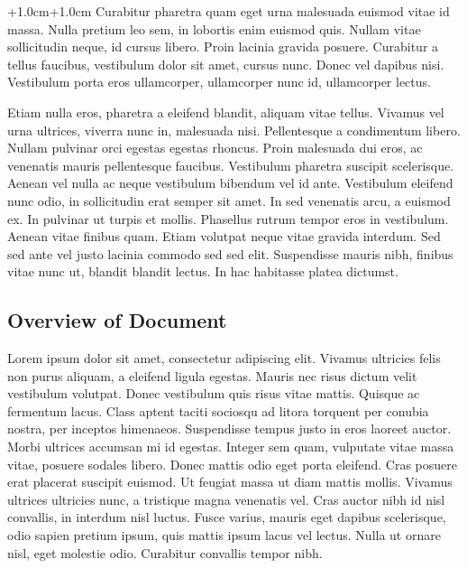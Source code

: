 \documentclass[english]{article}
\begin{document}
\begin{adjustwidth*}{+1.0cm}{+1.0cm}
{\large{}Curabitur pharetra quam eget urna malesuada euismod vitae
id massa. Nulla pretium leo sem, in lobortis enim euismod quis. Nullam
vitae sollicitudin neque, id cursus libero. Proin lacinia gravida
posuere. Curabitur a tellus faucibus, vestibulum dolor sit amet, cursus
nunc. Donec vel dapibus nisi. Vestibulum porta eros ullamcorper, ullamcorper
nunc id, ullamcorper lectus.}{\large \par}

{\large{}Etiam nulla eros, pharetra a eleifend blandit, aliquam vitae
tellus. Vivamus vel urna ultrices, viverra nunc in, malesuada nisi.
Pellentesque a condimentum libero. Nullam pulvinar orci egestas egestas
rhoncus. Proin malesuada dui eros, ac venenatis mauris pellentesque
faucibus. Vestibulum pharetra suscipit scelerisque. Aenean vel nulla
ac neque vestibulum bibendum vel id ante. Vestibulum eleifend nunc
odio, in sollicitudin erat semper sit amet. In sed venenatis arcu,
a euismod ex. In pulvinar ut turpis et mollis. Phasellus rutrum tempor
eros in vestibulum. Aenean vitae finibus quam. Etiam volutpat neque
vitae gravida interdum. Sed sed ante vel justo lacinia commodo sed
sed elit. Suspendisse mauris nibh, finibus vitae nunc ut, blandit
blandit lectus. In hac habitasse platea dictumst.}{\large \par}


\subsection{Overview of Document}

{\large{}Lorem ipsum dolor sit amet, consectetur adipiscing elit.
Vivamus ultricies felis non purus aliquam, a eleifend ligula egestas.
Mauris nec risus dictum velit vestibulum volutpat. Donec vestibulum
quis risus vitae mattis. Quisque ac fermentum lacus. Class aptent
taciti sociosqu ad litora torquent per conubia nostra, per inceptos
himenaeos. Suspendisse tempus justo in eros laoreet auctor. Morbi
ultrices accumsan mi id egestas. Integer sem quam, vulputate vitae
massa vitae, posuere sodales libero. Donec mattis odio eget porta
eleifend. Cras posuere erat placerat suscipit euismod. Ut feugiat
massa ut diam mattis mollis. Vivamus ultrices ultricies nunc, a tristique
magna venenatis vel. Cras auctor nibh id nisl convallis, in interdum
nisl luctus. Fusce varius, mauris eget dapibus scelerisque, odio sapien
pretium ipsum, quis mattis ipsum lacus vel lectus. Nulla ut ornare
nisl, eget molestie odio. Curabitur convallis tempor nibh.}{\large \par}


\end{adjustwidth*}
\end{document}
